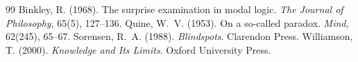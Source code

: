 \documentclass{situationist-preprint}
\begin{document}
\begin{thebibliography}{99}\small
{} Binkley, R. (1968). The surprise examination in modal logic. \emph{The Journal of Philosophy}, 65(5), 127--136.
 Quine, W.~V. (1953). On a so-called paradox. \emph{Mind}, 62(245), 65--67.
 Sorensen, R.~A. (1988). \emph{Blindspots}. Clarendon Press.
 Williamson, T. (2000). \emph{Knowledge and Its Limits}. Oxford University Press.
\end{thebibliography}
\end{document}
